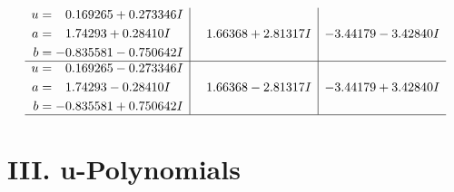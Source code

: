 \documentclass[1p]{elsarticle_modified}
\theoremstyle{definition}
\begin{document}
$$\begin{array}{c|c|c}
\begin{aligned}
u &= \phantom{-}0.169265 + 0.273346 I \\
a &= \phantom{-}1.74293 + 0.28410 I \\
b &= -0.835581 - 0.750642 I\end{aligned}
 & \phantom{-}1.66368 + 2.81317 I & -3.44179 - 3.42840 I \\ \hline\begin{aligned}
u &= \phantom{-}0.169265 - 0.273346 I \\
a &= \phantom{-}1.74293 - 0.28410 I \\
b &= -0.835581 + 0.750642 I\end{aligned}
 & \phantom{-}1.66368 - 2.81317 I & -3.44179 + 3.42840 I\\
 \hline 
 \end{array}$$\newpage
\newpage\renewcommand{\arraystretch}{1}
\centering \section*{ III. u-Polynomials}
\end{document}
